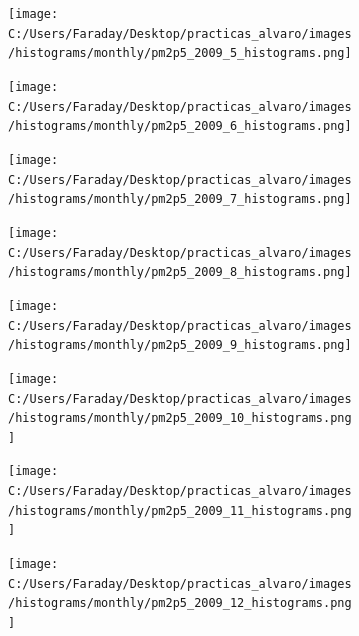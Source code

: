\documentclass[12pt]{article}
\begin{document}
\begin{figure}[H]
\centering
\begin{subfigure}[h]{0.45\textwidth}
\texttt{[image: C:/Users/Faraday/Desktop/practicas\_alvaro/images/histograms/monthly/pm2p5\_2009\_5\_histograms.png]}
\caption{}
\label{fig:hist-mon-4-5-2009}
\end{subfigure}
%
\begin{subfigure}[H]{0.45\textwidth}
\texttt{[image: C:/Users/Faraday/Desktop/practicas\_alvaro/images/histograms/monthly/pm2p5\_2009\_6\_histograms.png]}
\caption{}
\label{fig:hist-mon-4-6-2009}
\end{subfigure}
\caption{}
\end{figure}

\newpage

\begin{figure}[H]
\centering
\begin{subfigure}[h]{0.45\textwidth}
\texttt{[image: C:/Users/Faraday/Desktop/practicas\_alvaro/images/histograms/monthly/pm2p5\_2009\_7\_histograms.png]}
\caption{}
\label{fig:hist-mon-4-7-2009}
\end{subfigure}
%
\begin{subfigure}[H]{0.45\textwidth}
\texttt{[image: C:/Users/Faraday/Desktop/practicas\_alvaro/images/histograms/monthly/pm2p5\_2009\_8\_histograms.png]}
\caption{}
\label{fig:hist-mon-4-8-2009}
\end{subfigure}
\caption{}
\end{figure}

\begin{figure}[H]
\centering
\begin{subfigure}[h]{0.45\textwidth}
\texttt{[image: C:/Users/Faraday/Desktop/practicas\_alvaro/images/histograms/monthly/pm2p5\_2009\_9\_histograms.png]}
\caption{}
\label{fig:hist-mon-4-9-2009}
\end{subfigure}
%
\begin{subfigure}[H]{0.45\textwidth}
\texttt{[image: C:/Users/Faraday/Desktop/practicas\_alvaro/images/histograms/monthly/pm2p5\_2009\_10\_histograms.png]}
\caption{}
\label{fig:hist-mon-4-10-2009}
\end{subfigure}
\caption{}
\end{figure}

\begin{figure}[H]
\centering
\begin{subfigure}[h]{0.45\textwidth}
\texttt{[image: C:/Users/Faraday/Desktop/practicas\_alvaro/images/histograms/monthly/pm2p5\_2009\_11\_histograms.png]}
\caption{}
\label{fig:hist-mon-4-11-2009}
\end{subfigure}
%
\begin{subfigure}[H]{0.45\textwidth}
\texttt{[image: C:/Users/Faraday/Desktop/practicas\_alvaro/images/histograms/monthly/pm2p5\_2009\_12\_histograms.png]}
\caption{}
\label{fig:hist-mon-4-12-2009}
\end{subfigure}
\caption{}
\end{figure}
\end{document}
